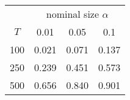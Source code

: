 % 
\begin{tabular}{cccc}
  \hline
  & \multicolumn{3}{c}{nominal size $\alpha$} \\
 $T$ & 0.01 & 0.05 & 0.1 \\
 \hline
100 & 0.021 & 0.071 & 0.137 \\ 
  250 & 0.239 & 0.451 & 0.573 \\ 
  500 & 0.656 & 0.840 & 0.901 \\ 
   \hline
\end{tabular}
